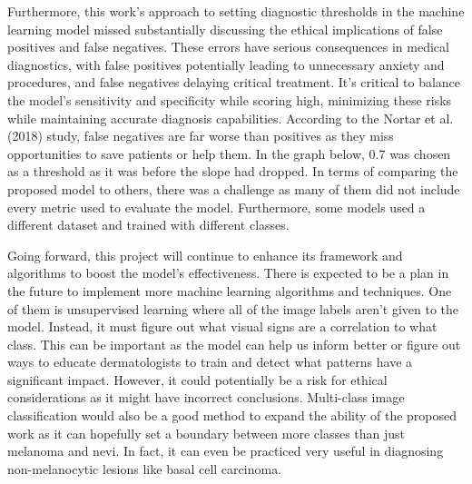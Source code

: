 \documentclass[10pt,twocolumn]{article}
\begin{document}
Furthermore, this work’s approach to setting diagnostic thresholds in the machine learning model missed substantially discussing the ethical implications of false positives and false negatives. These errors have serious consequences in medical diagnostics, with false positives potentially leading to unnecessary anxiety and procedures, and false negatives delaying critical treatment. It's critical to balance the model's sensitivity and specificity while scoring high, minimizing these risks while maintaining accurate diagnosis capabilities. According to the Nortar et al. (2018) study, false negatives are far worse than positives as they miss opportunities to save patients or help them. In the graph below, 0.7 was chosen as a threshold as it was before the slope had dropped. In terms of comparing the proposed model to others, there was a challenge as many of them did not include every metric used to evaluate the model. Furthermore, some models used a different dataset and trained with different classes. \newline

Going forward, this project will continue to enhance its framework and algorithms to boost the model's effectiveness. There is expected to be a plan in the future to implement more machine learning algorithms and techniques. One of them is unsupervised learning where all of the image labels aren’t given to the model. Instead, it must figure out what visual signs are a correlation to what class. This can be important as the model can help us inform better or figure out ways to educate dermatologists to train and detect what patterns have a significant impact. However, it could potentially be a risk for ethical considerations as it might have incorrect conclusions. Multi-class image classification would also be a good method to expand the ability of the proposed work as it can hopefully set a boundary between more classes than just melanoma and nevi. In fact, it can even be practiced very useful in diagnosing non-melanocytic lesions like basal cell carcinoma. 
\end{document}
